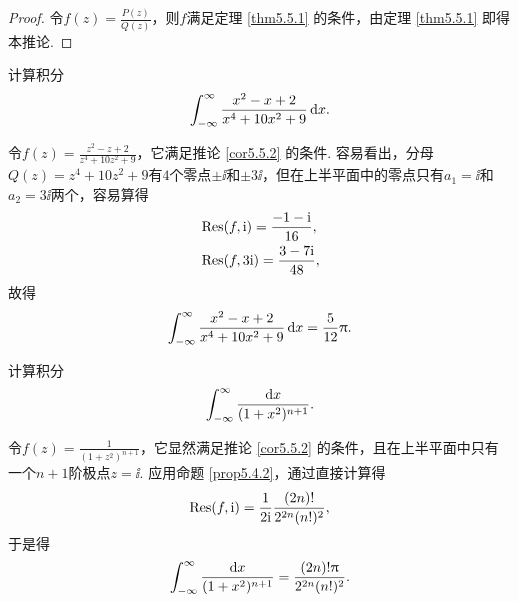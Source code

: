 \begin{proof}
令$f(z)=\frac{P(z)}{Q(z)}$，则$f$满足定理 \ref{thm5.5.1} 的条件，由定理 \ref{thm5.5.1} 即得本推论.
\end{proof}
\begin{example}\label{exam5.5.3}
计算积分
\[\int_{-\infty}^\infty\frac{x^2-x+2}{x^4+10x^2+9}\mathop{}\!\mathrm dx.\]
\end{example}
\begin{solution}
令$f(z)=\frac{z^2-z+2}{z^4+10z^2+9}$，它满足推论 \ref{cor5.5.2} 的条件. 容易看出，分母$Q(z)=z^4+10z^2+9$有$4$个零点$\pm\ii$和$\pm3\ii$，但在上半平面中的零点只有$a_1=\ii$和$a_2=3\ii$两个，容易算得
\begin{align*}
&\operatorname*{Res}(f,\mathrm i)=\frac{-1-\mathrm i}{16},\\
&\operatorname*{Res}(f,3\mathrm i)=\frac{3-7\mathrm i}{48},
\end{align*}
故得
\begin{equation*}
\int_{-\infty}^\infty\frac{x^2-x+2}{x^4+10x^2+9}\mathop{}\!\mathrm dx=\frac5{12}\uppi.
\end{equation*}
\end{solution}

\begin{example}\label{exam5.5.4}
计算积分
\[\int_{-\infty}^\infty\frac{\mathop{}\!\mathrm dx}{(1+x^2)^{n+1}}.\]
\end{example}
\begin{solution}
令$f(z)=\frac1{(1+z^2)^{n+1}}$，它显然满足推论 \ref{cor5.5.2} 的条件，且在上半平面中只有一个$n+1$阶极点$z=\ii$. 应用命题 \ref{prop5.4.2}，通过直接计算得
\[\operatorname*{Res}(f,\mathrm i)=\frac1{2\mathrm i}\frac{(2n)!}{2^{2n}(n!)^2},\]
于是得
\begin{equation*}
\int_{-\infty}^\infty\frac{\mathop{}\!\mathrm dx}{(1+x^2)^{n+1}}=\frac{(2n)!\uppi}{2^{2n}(n!)^2}.
\end{equation*}
\end{solution}


